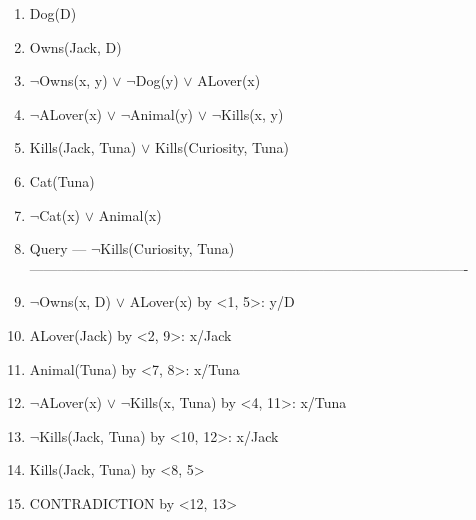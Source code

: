\documentclass[../../lecture_notes.tex]{subfiles}
\begin{document}
		\begin{enumerate} [itemsep=0mm]
			\item Dog(D)
			\item Owns(Jack, D)
			\item $\neg$Owns(x, y) $\lor$ $\neg$Dog(y) $\lor$ ALover(x)
			\item $\neg$ALover(x) $\lor$ $\neg$Animal(y) $\lor$ $\neg$Kills(x, y)
			\item Kills(Jack, Tuna) $\lor$ Kills(Curiosity, Tuna)
			\item Cat(Tuna)
			\item $\neg$Cat(x) $\lor$ Animal(x)
			\item Query — $\neg$Kills(Curiosity, Tuna)\\
			----------------------------------------------------------------------------------------------
			\item $\neg$Owns(x, D) $\lor$ ALover(x) by <1, 5>: {y/D}
			\item ALover(Jack) by <2, 9>: {x/Jack}
			\item Animal(Tuna) by <7, 8>: {x/Tuna}
			\item $\neg$ALover(x) $\lor$ $\neg$Kills(x, Tuna) by <4, 11>: {x/Tuna}
			\item $\neg$Kills(Jack, Tuna) by <10, 12>: {x/Jack}
			\item Kills(Jack, Tuna) by <8, 5>
			\item CONTRADICTION by <12, 13>
		\end{enumerate} \medskip
\end{document}
